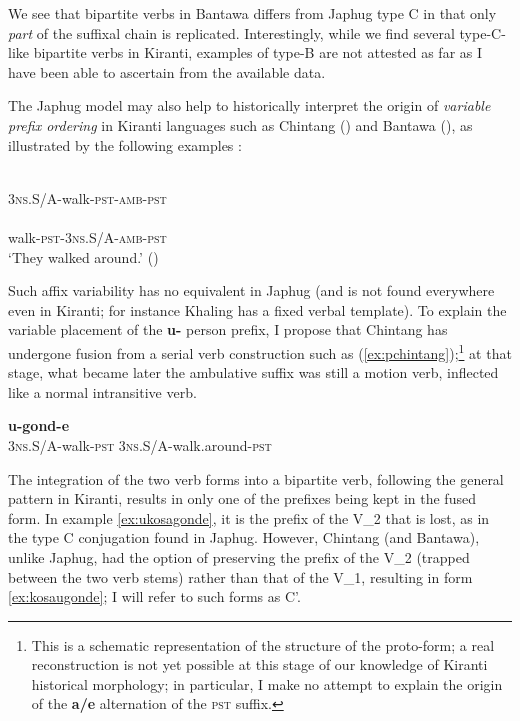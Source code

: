\documentclass[oneside,a4paper,11pt]{article}
\newcommand{\ipa}[1]{{\phon\textbf{#1}}}
\newcommand{\refb}[1]{(\ref{#1})}
\begin{document}
We see that bipartite verbs in Bantawa differs from Japhug type C in that only \textit{part} of the suffixal chain is replicated. Interestingly, while we find several type-C-like bipartite verbs in Kiranti, examples of type-B are not attested as far as I have been able to ascertain from the available data.

The Japhug model may also help to historically interpret the origin of \textit{variable prefix ordering}  in Kiranti languages such as Chintang (\citealt{bickel07chintang}) and Bantawa (\citealt[170-172]{doornenbal09}), as illustrated by the following examples :

\begin{exe}
\ex \label{ex:ukosagonde}
\gll \ipa{u-kos-a-gond-e} \\
\textsc{3ns.S/A}-walk-\textsc{pst-amb-pst} \\
\ex \label{ex:kosaugonde}
\gll \ipa{kos-a-u-gond-e} \\
walk-\textsc{pst-3ns.S/A-amb-pst} \\
\glt ‘They walked around.’ (\citealt[51]{bickel07chintang})
\end{exe}

Such affix variability has no equivalent in Japhug (and is not found everywhere even in Kiranti; for instance Khaling has a fixed verbal template). To explain the variable placement of the \ipa{u-} person prefix, I propose that Chintang has undergone  fusion from a serial verb construction such as \refb{ex:pchintang};\footnote{This is a schematic representation of the structure of the proto-form; a real reconstruction is not yet possible at this stage of our knowledge of Kiranti historical morphology; in particular, I make no attempt to explain the origin of the \ipa{a/e} alternation of the \textsc{pst} suffix. } at that stage, what became later the ambulative suffix was still a motion verb, inflected like a normal intransitive verb.

\begin{exe}
\ex \label{ex:pchintang}
\gll *\ipa{u-kos-e} \ipa{u-gond-e} \\
\textsc{3ns.S/A}-walk-\textsc{pst} \textsc{3ns.S/A}-walk.around-\textsc{pst} \\
\end{exe}


The integration of the two verb forms into a bipartite verb, following the general pattern in Kiranti, results in only one of the prefixes being kept in the fused form. In example \ref{ex:ukosagonde}, it is the prefix of the V_2 that is lost, as in the type C conjugation found in Japhug. However, Chintang (and Bantawa), unlike Japhug, had the option of preserving the prefix of the V_2 (trapped between the two verb stems) rather than that of the V_1, resulting in form \ref{ex:kosaugonde}; I will refer to such forms as C'.
\end{document}
